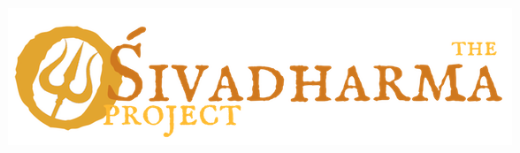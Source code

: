 \begin{center}
\includegraphics[scale=.3]{shivadharma_project_logo.jpg}

\end{center}
\pagebreak








\thispagestyle{empty}
\ \vskip3cm

